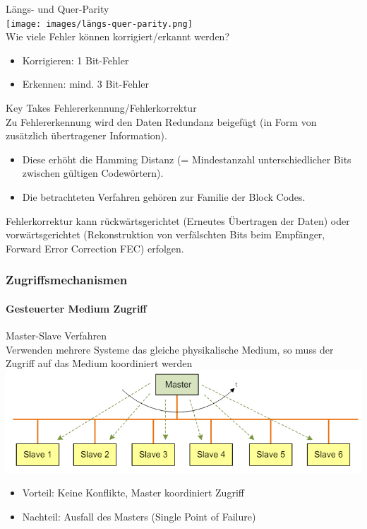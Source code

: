 \begin{concept}{Längs- und Quer-Parity}\\
        \texttt{[image: images/längs-quer-parity.png]}\\
    Wie viele Fehler können korrigiert/erkannt werden?
    \begin{itemize}
        \item Korrigieren: 1 Bit-Fehler
        \item Erkennen: mind. 3 Bit-Fehler
    \end{itemize}
\end{concept}

\begin{KR}{Key Takes Fehlererkennung/Fehlerkorrektur}\\
    Zu Fehlererkennung wird den Daten Redundanz beigefügt (in Form von zusätzlich übertragener Information).
    \begin{itemize}
        \item Diese erhöht die Hamming Distanz (= Mindestanzahl unterschiedlicher Bits zwischen gültigen Codewörtern).
        \item Die betrachteten Verfahren gehören zur Familie der Block Codes.
    \end{itemize}
    Fehlerkorrektur kann rückwärtsgerichtet (Erneutes Übertragen der Daten) oder vorwärtsgerichtet (Rekonstruktion von verfälschten Bits beim Empfänger, Forward Error Correction FEC) erfolgen.
\end{KR}

\subsubsection{Zugriffsmechanismen}

\paragraph{Gesteuerter Medium Zugriff}

\begin{definition}{Master-Slave Verfahren}\\
    Verwenden mehrere Systeme das gleiche physikalische Medium, so muss der Zugriff auf das Medium koordiniert werden\\
        \includegraphics[width=0.75\linewidth]{images/master-slave.png}
    \begin{itemize}
        \item Vorteil: Keine Konflikte, Master koordiniert Zugriff
        \item Nachteil: Ausfall des Masters (Single Point of Failure)
    \end{itemize}
\end{definition}


